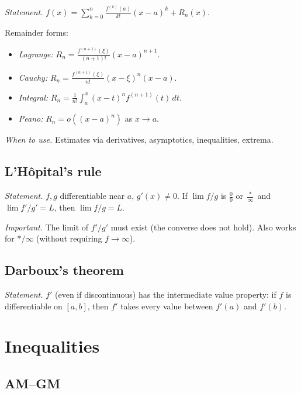 \textit{Statement.} $f(x)=\sum_{k=0}^n\frac{f^{(k)}(a)}{k!}(x-a)^k+R_n(x)$.

Remainder forms:
\begin{itemize}
  \item \textit{Lagrange:} $R_n=\frac{f^{(n+1)}(\xi)}{(n+1)!}(x-a)^{n+1}$.
  \item \textit{Cauchy:} $R_n=\frac{f^{(n+1)}(\xi)}{n!}(x-\xi)^n(x-a)$.
  \item \textit{Integral:} $R_n=\frac1{n!}\int_a^x (x-t)^n f^{(n+1)}(t)\,dt$.
  \item \textit{Peano:} $R_n=o((x-a)^n)$ as $x\to a$.
\end{itemize}

\textit{When to use.} Estimates via derivatives, asymptotics, inequalities, extrema.

\medskip

\subsection{L'H\^opital's rule}
\label{subsec:lhopital}

\textit{Statement.} $f,g$ differentiable near $a$, $g'(x)\neq0$. If $\lim f/g$ is $\frac00$ or $\frac{*}{\infty}$ and $\lim f'/g'=L$, then $\lim f/g=L$.

\textit{Important.} The limit of $f'/g'$ must exist (the converse does not hold). Also works for $*/\infty$ (without requiring $f\to\infty$).

\medskip

\subsection{Darboux's theorem}
\label{subsec:darboux}

\textit{Statement.} $f'$ (even if discontinuous) has the intermediate value property: if $f$ is differentiable on $[a,b]$, then $f'$ takes every value between $f'(a)$ and $f'(b)$.

\medskip

\section{Inequalities}
\label{sec:inequalities}

\subsection{AM--GM}
\label{subsec:am-gm}


